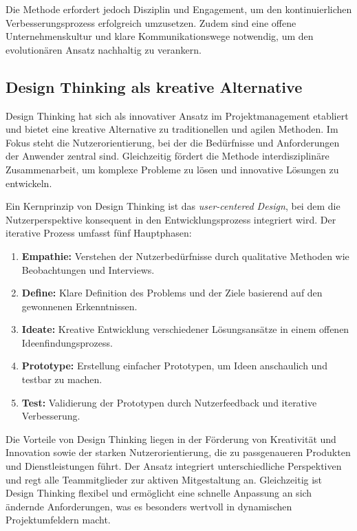 \documentclass[ngerman]{seminarvorlage}
\begin{document}
Die Methode erfordert jedoch Disziplin und Engagement, um den kontinuierlichen Verbesserungsprozess erfolgreich umzusetzen. Zudem sind eine offene Unternehmenskultur und klare Kommunikationswege notwendig, um den evolutionären Ansatz nachhaltig zu verankern.
\cite{schonfeld_warum_2024, bmi_kanban_2020}

\subsection{Design Thinking als kreative Alternative}  
Design Thinking hat sich als innovativer Ansatz im Projektmanagement etabliert und bietet eine kreative Alternative zu traditionellen und agilen Methoden. Im Fokus steht die Nutzerorientierung, bei der die Bedürfnisse und Anforderungen der Anwender zentral sind. Gleichzeitig fördert die Methode interdisziplinäre Zusammenarbeit, um komplexe Probleme zu lösen und innovative Lösungen zu entwickeln.  

Ein Kernprinzip von Design Thinking ist das \textit{user-centered Design}, bei dem die Nutzerperspektive konsequent in den Entwicklungsprozess integriert wird. Der iterative Prozess umfasst fünf Hauptphasen:  

\begin{enumerate}  
    \item \textbf{Empathie:} Verstehen der Nutzerbedürfnisse durch qualitative Methoden wie Beobachtungen und Interviews.  
    \item \textbf{Define:} Klare Definition des Problems und der Ziele basierend auf den gewonnenen Erkenntnissen.  
    \item \textbf{Ideate:} Kreative Entwicklung verschiedener Lösungsansätze in einem offenen Ideenfindungsprozess.  
    \item \textbf{Prototype:} Erstellung einfacher Prototypen, um Ideen anschaulich und testbar zu machen.  
    \item \textbf{Test:} Validierung der Prototypen durch Nutzerfeedback und iterative Verbesserung.  
\end{enumerate}  

Die Vorteile von Design Thinking liegen in der Förderung von Kreativität und Innovation sowie der starken Nutzerorientierung, die zu passgenaueren Produkten und Dienstleistungen führt. Der Ansatz integriert unterschiedliche Perspektiven und regt alle Teammitglieder zur aktiven Mitgestaltung an. Gleichzeitig ist Design Thinking flexibel und ermöglicht eine schnelle Anpassung an sich ändernde Anforderungen, was es besonders wertvoll in dynamischen Projektumfeldern macht.  
\end{document}
